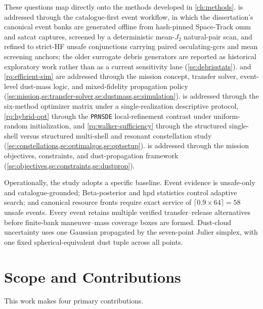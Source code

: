 These questions map directly onto the methods developed in \cref{ch:methods}.  is addressed through the catalogue-first event workflow, in which the dissertation's canonical event banks are generated offline from hash-pinned Space-Track \gls{omm} and \gls{satcat} captures, screened by a deterministic mean-\(J_2\) natural-pair scan, and refined to strict-HF unsafe conjunctions carrying paired osculating-\gls{gcrs} and mean screening anchors; the older surrogate debris generators are reported as historical exploratory work rather than as a current sensitivity lane (\cref{se:debrisstats}).  and \cref{rq:efficient-sim} are addressed through the mission concept, transfer solver, event-level dust-mass logic, and mixed-fidelity propagation policy (\cref{se:mission,se:transfer-solver,se:dustmass,se:simulation}).  is addressed through the six-method optimizer matrix under a single-realization descriptive protocol, \cref{rq:hybrid-opt} through the \texttt{PRNSDE} local-refinement contrast under uniform-random initialization, and \cref{rq:walker-sufficiency} through the structured single-shell versus structured multi-shell and resonant constellation study (\cref{se:constellations,se:optimalgos,se:optsetup}).  is addressed through the mission objectives, constraints, and dust-propagation framework (\cref{se:objectives,se:constraints,se:dustprop}).

Operationally, the study adopts a specific baseline. Event evidence is unsafe-only and catalogue-grounded; Beta-posterior and \gls{hpd} statistics control adaptive search; and canonical resource fronts require exact service of \(\lceil0.9\times64\rceil=58\) unsafe events. Every event retains multiple verified transfer--release alternatives before finite-bank maneuver--mass coverage boxes are formed. Dust-cloud uncertainty uses one Gaussian propagated by the seven-point Julier simplex, with one fixed spherical-equivalent dust tuple across all points.

\section{Scope and Contributions}
This work makes four primary contributions.

